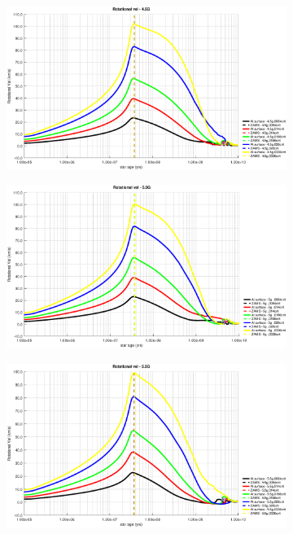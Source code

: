 \documentclass[fleqn,usenatbib]{mnras}
\begin{document}
\begin{figure}
\begin{subfigure}[h]{0.47\textwidth}
    \label{fig:subim43}
    \end{subfigure}
    \begin{subfigure}[h]{0.47\textwidth}
    \includegraphics[width=\textwidth]{figures/rot_vel_4_5g.eps}
    \label{fig:subim44}
    \end{subfigure}
    \begin{subfigure}[h]{0.47\textwidth}
    \includegraphics[width=\textwidth]{figures/rot_vel_5g.eps}
    \label{fig:subim45}
    \end{subfigure}
    \begin{subfigure}[h]{0.47\textwidth}
    \includegraphics[width=\textwidth]{figures/rot_vel_5_5g.eps}

\end{subfigure}
\end{figure}
\end{document}
